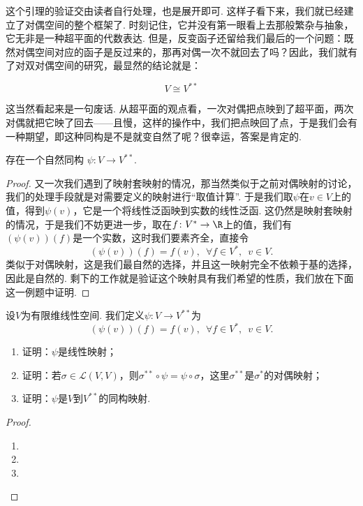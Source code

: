 这个引理的验证交由读者自行处理，也是展开即可. 这样子看下来，我们就已经建立了对偶空间的整个框架了. 时刻记住，它并没有第一眼看上去那般繁杂与抽象，它无非是一种超平面的代数表达. 但是，反变函子还留给我们最后的一个问题：既然对偶空间对应的函子是反过来的，那再对偶一次不就回去了吗？因此，我们就有了对双对偶空间的研究，最显然的结论就是：

\[
    V \cong V^{**}
\]

这当然看起来是一句废话. 从超平面的观点看，一次对偶把点映到了超平面，两次对偶就把它映了回去——且慢，这样的操作中，我们把点映回了点，于是我们会有一种期望，即这种同构是不是就变自然了呢？很幸运，答案是肯定的.

\begin{theorem}{}{}
    存在一个自然同构 $\psi: V \to V^{**}$.
\end{theorem}

\begin{proof}
    又一次我们遇到了映射套映射的情况，那当然类似于之前对偶映射的讨论，我们的处理手段就是对需要定义的映射进行``取值计算''. 于是我们取$\psi$在$v\in V$上的值，得到$\psi(v)$，它是一个将线性泛函映到实数的线性泛函. 这仍然是映射套映射的情况，于是我们不妨更进一步，取在$f\colon V^*\to\R$上的值，我们有$(\psi(v))(f)$是一个实数，这时我们要素齐全，直接令
    \[(\psi(v))(f) = f(v),\enspace\forall f\in V^*,\enspace v\in V.\]
    类似于对偶映射，这是我们最自然的选择，并且这一映射完全不依赖于基的选择，因此是自然的. 剩下的工作就是验证这个映射具有我们希望的性质，我们放在下面这一例题中证明.
\end{proof}

\begin{example}{}{}
    设$V$为有限维线性空间. 我们定义$\psi:V\to V^{**}$为
    \[(\psi(v))(f) = f(v),\enspace\forall f\in V^*,\enspace v\in V.\]
    \begin{enumerate}
        \item 证明：$\psi$是线性映射；

        \item 证明：若$\sigma\in\mathcal{L}(V,V)$，则$\sigma^{**}\circ\psi=\psi\circ\sigma$，这里$\sigma^{**}$是$\sigma^*$的对偶映射；

        \item 证明：$\psi$是$V$到$V^{**}$的同构映射.
    \end{enumerate}
\end{example}

\begin{proof}
    \begin{enumerate}
        \item
        \item
        \item
    \end{enumerate}
\end{proof}

